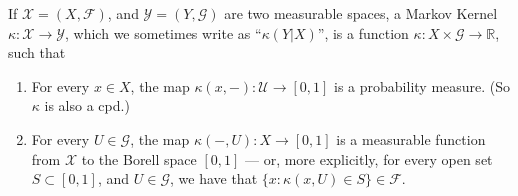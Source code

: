 \documentclass[twoside]{article} %
\theoremstyle{plain}
\theoremstyle{definition}
\begin{document}
    \begin{defn}
        If $\mathcal X  = (X, \mathcal F)$, and $\mathcal Y = (Y, \mathcal G)$ are two measurable spaces, a Markov Kernel $\kappa : \mathcal X \to \mathcal Y$, which we sometimes write as ``$\kappa(Y|X)$'', is a function $\kappa : X \times \mathcal G \to \mathbb R$, such that
        \begin{enumerate}
            \item For every $x \in X$, the map $\kappa(x, -) : \mathcal U \to [0,1]$ is a probability measure. (So $\kappa$ is also a cpd.)
            \item For every $U \in \mathcal G$, the map $\kappa(-, U) : X \to [0,1]$ is a measurable function from $\mathcal X$ to the Borell space $[0,1]$
            --- or, more explicitly, for every open set $S \subset [0,1]$, and $U \in \mathcal G$, we have that
            $\{x : \kappa(x,U) \in S\} \in \mathcal F$. 
    \end{enumerate}
    \end{defn}
    
\end{document}
